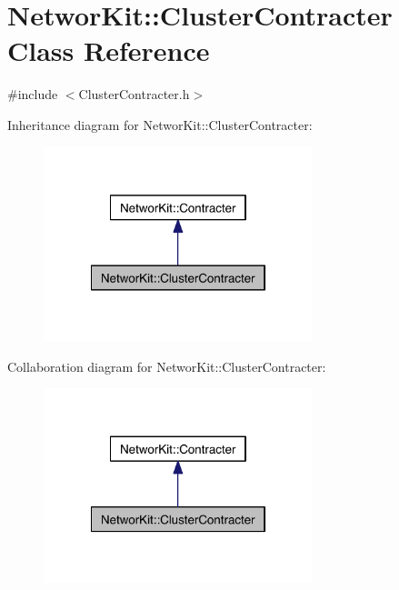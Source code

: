\hypertarget{class_networ_kit_1_1_cluster_contracter}{\section{Networ\-Kit\-:\-:Cluster\-Contracter Class Reference}
\label{class_networ_kit_1_1_cluster_contracter}
}


{\ttfamily \#include $<$Cluster\-Contracter.\-h$>$}



Inheritance diagram for Networ\-Kit\-:\-:Cluster\-Contracter\-:\nopagebreak
\begin{figure}[H]
\begin{center}
\leavevmode
\includegraphics[width=222pt]{class_networ_kit_1_1_cluster_contracter__inherit__graph}
\end{center}
\end{figure}


Collaboration diagram for Networ\-Kit\-:\-:Cluster\-Contracter\-:\nopagebreak
\begin{figure}[H]
\begin{center}
\leavevmode
\includegraphics[width=222pt]{class_networ_kit_1_1_cluster_contracter__coll__graph}
\end{center}
\end{figure}
